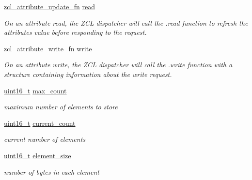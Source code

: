 \begin{DoxyCompactItemize}
\hyperlink{group__zcl_gace94cfc3f22379fa08a5b8de8c6977f6}{zcl\+\_\+attribute\+\_\+update\+\_\+fn} \hyperlink{group__zcl_ga80943597b8cce9d751a45efa823596ac}{read}
\begin{DoxyCompactList}\small\item\em On an attribute read, the Z\+CL dispatcher will call the .read function to refresh the attribute\textquotesingle{}s value before responding to the request. \end{DoxyCompactList}\item 
\hyperlink{group__zcl_ga70fa1740c517a1e49c700cba7cf6b339}{zcl\+\_\+attribute\+\_\+write\+\_\+fn} \hyperlink{group__zcl_gac8bd2f85f7df500d34b1d3cd27033a4e}{write}
\begin{DoxyCompactList}\small\item\em On an attribute write, the Z\+CL dispatcher will call the .write function with a structure containing information about the write request. \end{DoxyCompactList}\item 
\mbox{\label{group__zcl_ga7b50573c335728800d65f3fb5479f9bc}} 
\hyperlink{group__hal__dos_ga5a8b2dc9e45a9ee81a94ef304fb62505}{uint16\+\_\+t} \hyperlink{group__zcl_ga7b50573c335728800d65f3fb5479f9bc}{max\+\_\+count}
\begin{DoxyCompactList}\small\item\em maximum number of elements to store \end{DoxyCompactList}\item 
\mbox{\label{group__zcl_gaf83468db7e4fc12ef11ded6f62ffe7f8}} 
\hyperlink{group__hal__dos_ga5a8b2dc9e45a9ee81a94ef304fb62505}{uint16\+\_\+t} \hyperlink{group__zcl_gaf83468db7e4fc12ef11ded6f62ffe7f8}{current\+\_\+count}
\begin{DoxyCompactList}\small\item\em current number of elements \end{DoxyCompactList}\item 
\mbox{\label{group__zcl_ga16152e39a199182441f04a3360c45657}} 
\hyperlink{group__hal__dos_ga5a8b2dc9e45a9ee81a94ef304fb62505}{uint16\+\_\+t} \hyperlink{group__zcl_ga16152e39a199182441f04a3360c45657}{element\+\_\+size}
\begin{DoxyCompactList}\small\item\em number of bytes in each element \end{DoxyCompactList}\item 

\end{DoxyCompactItemize}
